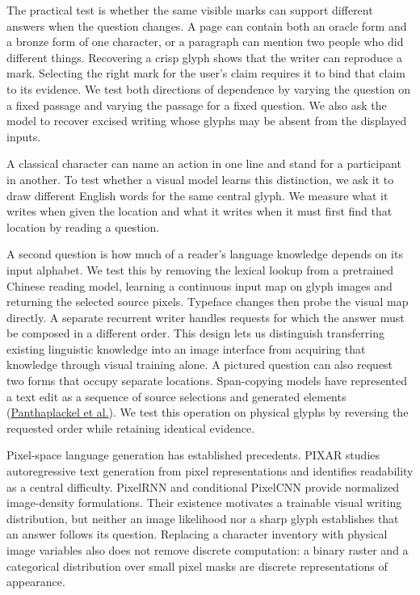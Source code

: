 The practical test is whether the same visible marks can support different answers when the question changes. A page can contain both an oracle form and a bronze form of one character, or a paragraph can mention two people who did different things. Recovering a crisp glyph shows that the writer can reproduce a mark. Selecting the right mark for the user's claim requires it to bind that claim to its evidence. We test both directions of dependence by varying the question on a fixed passage and varying the passage for a fixed question. We also ask the model to recover excised writing whose glyphs may be absent from the displayed inputs.

A classical character can name an action in one line and stand for a participant in another. To test whether a visual model learns this distinction, we ask it to draw different English words for the same central glyph. We measure what it writes when given the location and what it writes when it must first find that location by reading a question.

A second question is how much of a reader's language knowledge depends on its input alphabet. We test this by removing the lexical lookup from a pretrained Chinese reading model, learning a continuous input map on glyph images and returning the selected source pixels. Typeface changes then probe the visual map directly. A separate recurrent writer handles requests for which the answer must be composed in a different order. This design lets us distinguish transferring existing linguistic knowledge into an image interface from acquiring that knowledge through visual training alone. A pictured question can also request two forms that occupy separate locations. Span-copying models have represented a text edit as a sequence of source selections and generated elements (\href{https://arxiv.org/abs/2006.04771}{Panthaplackel et al.}). We test this operation on physical glyphs by reversing the requested order while retaining identical evidence.

Pixel-space language generation has established precedents. PIXAR studies
autoregressive text generation from pixel representations and identifies
readability as a central difficulty\cite{pixar}. PixelRNN and conditional
PixelCNN provide normalized image-density formulations\cite{pixelrnn,pixelcnn}.
Their existence motivates a trainable visual writing distribution, but neither
an image likelihood nor a sharp glyph establishes that an answer follows its
question. Replacing a character inventory with physical image variables also
does not remove discrete computation: a binary raster and a categorical
distribution over small pixel masks are discrete representations of appearance.

